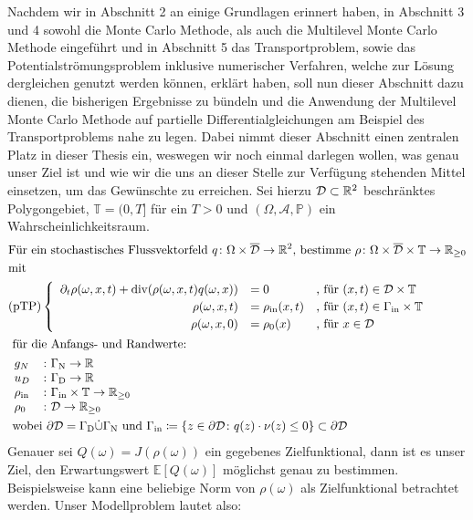 Nachdem wir in Abschnitt 2 an einige Grundlagen erinnert haben, in Abschnitt 3 und 4 sowohl die Monte Carlo Methode, als auch die Multilevel Monte Carlo Methode eingeführt und in Abschnitt 5 das Transportproblem, sowie das Potentialströmungsproblem inklusive numerischer Verfahren, welche zur Lösung dergleichen genutzt werden können, erklärt haben, soll nun dieser Abschnitt dazu dienen, die bisherigen Ergebnisse zu bündeln und die Anwendung der Multilevel Monte Carlo Methode auf partielle Differentialgleichungen am Beispiel des Transportproblems nahe zu legen. Dabei nimmt dieser Abschnitt einen zentralen Platz in dieser Thesis ein, weswegen wir noch einmal darlegen wollen, was genau unser Ziel ist und wie wir die uns an dieser Stelle zur Verfügung stehenden Mittel einsetzen, um das Gewünschte zu erreichen. Sei hierzu $ \mathcal{ D} \subset \mathbb{R}^2 $ beschränktes Polygongebiet, $ \mathbb{T} = (0,T] $ für ein $ T>0 $ und $ (\Omega,\mathcal{A},\mathbb{P}) $ ein Wahrscheinlichkeitsraum.
\begin{align*}
&\text{Für ein stochastisches Flussvektorfeld } q \colon \Omega \times \overline{\mathcal{D}} \to \R^2 \text{, bestimme }\rho \colon \Omega \times \overline{\mathcal{D}} \times \mathbb{T} \to \R_{\geq 0}\\ 
&\text{mit} \\
&\text{(pTP)} 
\begin{cases}
\begin{array}{rlll}
\partial_t \rho (\omega, x, t) + \dive(\rho(\omega,x,t)q(\omega,x)) &= 0 &\text{, für } (x,t) \in \mathcal{D} \times \mathbb{T} \\
\rho(\omega,x,t) &= \rho_{\text{in}}(x,t) &\text{, für } (x,t) \in \Gamma_{\text{in}} \times \mathbb{T} \\
\rho(\omega,x,0)  &= \rho_0(x) &\text{, für } x \in  \mathcal{D}
\end{array}
\end{cases} \\
&\text{ für die Anfangs- und Randwerte: } \\ 
&\begin{array}{llr}
g_N& \colon \Gamma_{\text{N}} \to \R \\
u_D& \colon \Gamma_{\text{D}} \to \R \\
\rho_{\text{in}}& \colon \Gamma_{\text{in}} \times \mathbb{T} \to \R_{\geq0} \\
\rho_0& \colon \mathcal{D} \to \R_{\geq0} \\
\end{array} \newline \\
&\text{ wobei } \partial \mathcal{D} = \Gamma_{\text{D}} \dot{\cup} \Gamma_{\text{N}}  \text{ und }  \Gamma_{\text{in}} \coloneqq  \{ z \in \partial \mathcal{D} \colon q(z)\cdot \nu(z) \leq 0 \} \subset  \partial \mathcal{D}
\end{align*}
Genauer sei $ Q(\omega) = J(\rho(\omega)) $ ein gegebenes Zielfunktional, dann ist es unser Ziel, den Erwartungswert $ \mathbb{E}[Q(\omega)] $ möglichst genau zu bestimmen. Beispielsweise kann eine beliebige Norm von $ \rho(\omega) $ als Zielfunktional betrachtet werden.
Unser Modellproblem lautet also:

